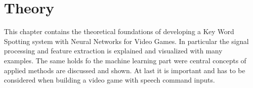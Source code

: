 
\chapter{Theory}
This chapter contains the theoretical foundations of developing a Key Word Spotting system with Neural Networks for Video Games. 
In particular the signal processing and feature extraction is explained and visualized with many examples.
The same holds fo the machine learning part were central concepts of applied methods are discussed and shown.
At last it is important and has to be considered when building a video game with speech command inputs.










